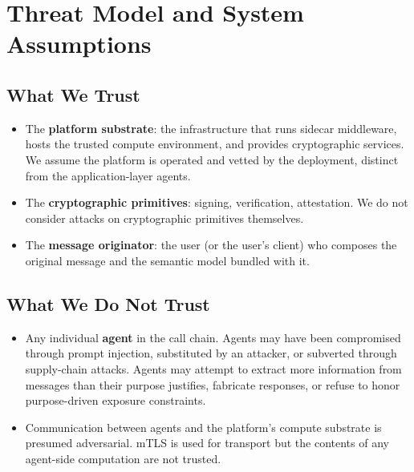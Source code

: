 \documentclass[sigconf,nonacm]{acmart}
\begin{document}

\section{Threat Model and System Assumptions}
\label{sec:threat}


\subsection{What We Trust}

\begin{itemize}
    \item The \textbf{platform substrate}: the infrastructure that runs sidecar middleware, hosts the trusted compute environment, and provides cryptographic services. We assume the platform is operated and vetted by the deployment, distinct from the application-layer agents.
    \item The \textbf{cryptographic primitives}: signing, verification, attestation. We do not consider attacks on cryptographic primitives themselves.
    \item The \textbf{message originator}: the user (or the user's client) who composes the original message and the semantic model bundled with it. 
\end{itemize}

\subsection{What We Do Not Trust}

\begin{itemize}
    \item Any individual \textbf{agent} in the call chain. Agents may have been compromised through prompt injection, substituted by an attacker, or subverted through supply-chain attacks. Agents may attempt to extract more information from messages than their purpose justifies, fabricate responses, or refuse to honor purpose-driven exposure constraints.
    \item Communication between agents and the platform's compute substrate is presumed adversarial. mTLS is used for transport but the contents of any agent-side computation are not trusted.
\end{itemize}
\end{document}
